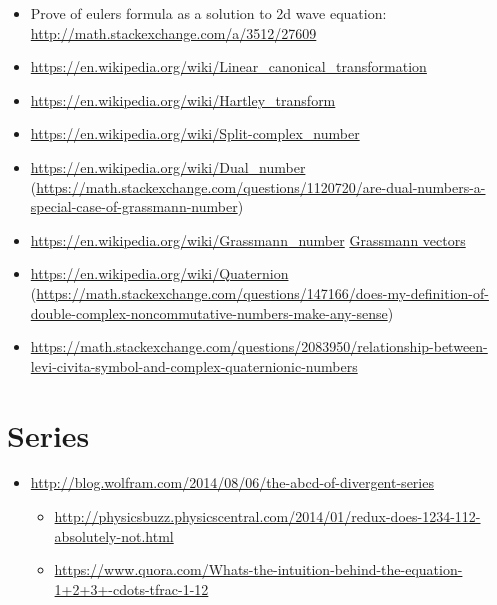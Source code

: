 \begin{itemize}
\item Prove of eulers formula as a solution to 2d wave equation: \url{http://math.stackexchange.com/a/3512/27609}
\item \url{https://en.wikipedia.org/wiki/Linear_canonical_transformation}
\item \url{https://en.wikipedia.org/wiki/Hartley_transform}
\item \url{https://en.wikipedia.org/wiki/Split-complex_number}
\item \url{https://en.wikipedia.org/wiki/Dual_number} (\url{https://math.stackexchange.com/questions/1120720/are-dual-numbers-a-special-case-of-grassmann-number})
\item \url{https://en.wikipedia.org/wiki/Grassmann_number} \href{https://math.stackexchange.com/questions/1108045/relationship-between-levi-civita-symbol-and-grassmann-numbers}{Grassmann vectors}
\item \url{https://en.wikipedia.org/wiki/Quaternion} (\url{https://math.stackexchange.com/questions/147166/does-my-definition-of-double-complex-noncommutative-numbers-make-any-sense})
\item \url{https://math.stackexchange.com/questions/2083950/relationship-between-levi-civita-symbol-and-complex-quaternionic-numbers}
\end{itemize}
\section{Series}

\begin{itemize}
\item \url{http://blog.wolfram.com/2014/08/06/the-abcd-of-divergent-series}
\begin{itemize}
\item \url{http://physicsbuzz.physicscentral.com/2014/01/redux-does-1234-112-absolutely-not.html}
\item \url{https://www.quora.com/Whats-the-intuition-behind-the-equation-1+2+3+-cdots-tfrac-1-12}
\end{itemize}
\end{itemize}

%




